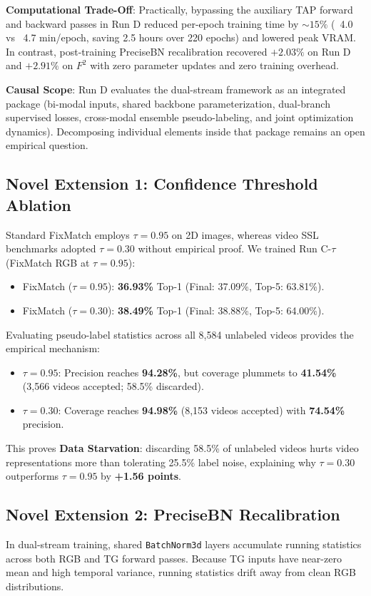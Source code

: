 \documentclass[10pt,twocolumn,a4paper]{article}
\begin{document}
\noindent \textbf{Computational Trade-Off}:  
Practically, bypassing the auxiliary TAP forward and backward passes in Run D reduced per-epoch training time by $\sim 15\%$ (~4.0 vs ~4.7 min/epoch, saving 2.5 hours over 220 epochs) and lowered peak VRAM. In contrast, post-training PreciseBN recalibration recovered $+2.03\%$ on Run D and $+2.91\%$ on $F^2$ with zero parameter updates and zero training overhead.

\noindent \textbf{Causal Scope}:  
Run D evaluates the dual-stream framework as an integrated package (bi-modal inputs, shared backbone parameterization, dual-branch supervised losses, cross-modal ensemble pseudo-labeling, and joint optimization dynamics). Decomposing individual elements inside that package remains an open empirical question.

\subsection{Novel Extension 1: Confidence Threshold Ablation}
\label{sec:ablation_thresh}
Standard FixMatch employs $\tau = 0.95$ on 2D images, whereas video SSL benchmarks adopted $\tau = 0.30$ without empirical proof. We trained Run C-$\tau$ (FixMatch RGB at $\tau=0.95$):
\begin{itemize}
    \item FixMatch ($\tau = 0.95$): \textbf{36.93\%} Top-1 (Final: 37.09\%, Top-5: 63.81\%).
    \item FixMatch ($\tau = 0.30$): \textbf{38.49\%} Top-1 (Final: 38.88\%, Top-5: 64.00\%).
\end{itemize}
Evaluating pseudo-label statistics across all 8,584 unlabeled videos provides the empirical mechanism:
\begin{itemize}
    \item $\tau = 0.95$: Precision reaches \textbf{94.28\%}, but coverage plummets to \textbf{41.54\%} (3,566 videos accepted; 58.5\% discarded).
    \item $\tau = 0.30$: Coverage reaches \textbf{94.98\%} (8,153 videos accepted) with \textbf{74.54\%} precision.
\end{itemize}
This proves \textbf{Data Starvation}: discarding 58.5\% of unlabeled videos hurts video representations more than tolerating 25.5\% label noise, explaining why $\tau=0.30$ outperforms $\tau=0.95$ by \textbf{+1.56 points}.

\subsection{Novel Extension 2: PreciseBN Recalibration}
\label{sec:precise_bn}
In dual-stream training, shared \texttt{BatchNorm3d} layers accumulate running statistics across both RGB and TG forward passes. Because TG inputs have near-zero mean and high temporal variance, running statistics drift away from clean RGB distributions.
\end{document}
